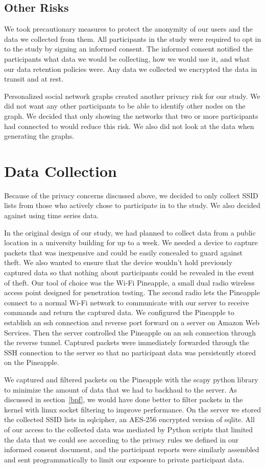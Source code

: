 \documentclass[letterpaper,twocolumn,10pt]{article}
\begin{document}
\subsection{Other Risks}
We took precautionary measures to protect the anonymity of our users and the data we collected from them. All participants in the study were required to opt in to the study by signing an informed consent. The informed consent notified the participants what data we would be collecting, how we would use it, and what our data retention policies were. Any data we collected we encrypted the data in transit and at rest. 

Personalized social network graphs created another privacy risk for our study. We did not want any other participants to be able to identify other nodes on the graph. We decided that only showing the networks that two or more participants had connected to would reduce this risk. We also did not look at the data when generating the graphs.



\section{Data Collection}
Because of the privacy concerns discussed above, we decided to only collect SSID lists from those who actively chose to participate in to the study. We also decided against using time series data.

In the original design of our study, we had planned to collect data from a public location in a university building for up to a week. We needed a device to capture packets that was inexpensive and could be easily concealed to guard against theft. We also wanted to ensure that the device wouldn't hold previously captured data so that nothing about participants could be revealed in the event of theft. Our tool of choice was the Wi-Fi Pineapple, a small dual radio wireless access point designed for penetration testing. The second radio lets the Pineapple connect to a normal Wi-Fi network to communicate with our server to receive commands and return the captured data. We configured the Pineapple to establish an ssh connection and reverse port forward on a server on Amazon Web Services. Then the server controlled the Pineapple on an ssh connection through the reverse tunnel. Captured packets were immediately forwarded through the SSH connection to the server so that no participant data was persistently stored on the Pineapple.

We captured and filtered packets on the Pineapple with the scapy python library to minimize the amount of data that we had to backhaul to the server. As discussed in section~\ref{bpf}, we would have done better to filter packets in the kernel with linux socket filtering to improve performance. On the server we stored the collected SSID lists in sqlcipher, an AES-256 encrypted version of sqlite. All of our access to the collected data was mediated by Python scripts that limited the data that we could see according to the privacy rules we defined in our informed consent document, and the participant reports were similarly assembled and sent programmatically to limit our exposure to private participant data.
\end{document}
